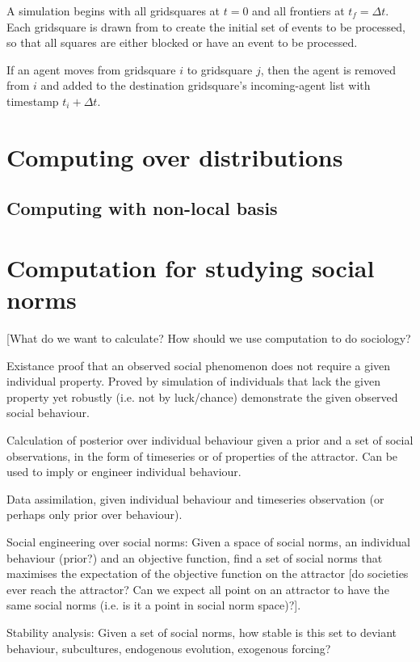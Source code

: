 \documentclass[a4paper]{article}
\begin{document}
A simulation begins with all gridsquares at $t=0$ and all frontiers at $t_f=\Delta t$. Each gridsquare is drawn from to create the initial set of events to be processed, so that all squares are either blocked or have an event to be processed.

If an agent moves from gridsquare $i$ to gridsquare $j$, then the agent is removed from $i$ and added to the destination gridsquare's incoming-agent list with timestamp $t_i + \Delta t$.

\section{Computing over distributions}

\subsection{Computing with non-local basis}



\section{Computation for studying social norms}

[What do we want to calculate? How should we use computation to do sociology?

Existance proof that an observed social phenomenon does not require a given individual property. Proved by simulation of individuals that lack the given property yet robustly (i.e. not by luck/chance) demonstrate the given observed social behaviour.

Calculation of posterior over individual behaviour given a prior and a set of social observations, in the form of timeseries or of properties of the attractor. Can be used to imply or engineer individual behaviour.

Data assimilation, given individual behaviour and timeseries observation (or perhaps only prior over behaviour).

Social engineering over social norms: Given a space of social norms, an individual behaviour (prior?) and an objective function, find a set of social norms that maximises the expectation of the objective function on the attractor [do societies ever reach the attractor? Can we expect all point on an attractor to have the same social norms (i.e. is it a point in social norm space)?]. 

Stability analysis: Given a set of social norms, how stable is this set to deviant behaviour, subcultures, endogenous evolution, exogenous forcing?
\end{document}
